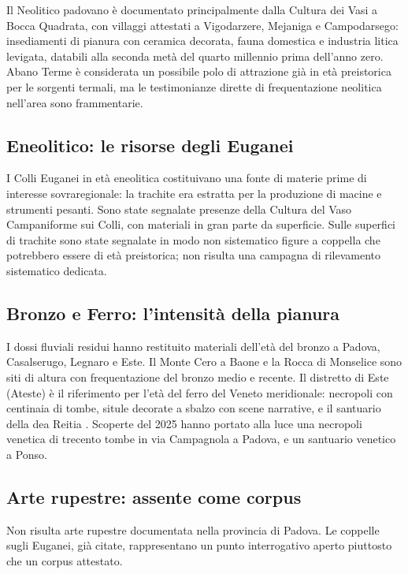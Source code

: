Il Neolitico padovano è documentato principalmente dalla Cultura dei Vasi a Bocca Quadrata, con villaggi attestati a Vigodarzere, Mejaniga e Campodarsego: insediamenti di pianura con ceramica decorata, fauna domestica e industria litica levigata, databili alla seconda metà del quarto millennio prima dell'anno zero. Abano Terme è considerata un possibile polo di attrazione già in età preistorica per le sorgenti termali, ma le testimonianze dirette di frequentazione neolitica nell'area sono frammentarie.

\subsection{Eneolitico: le risorse degli Euganei}

I Colli Euganei in età eneolitica costituivano una fonte di materie prime di interesse sovraregionale: la trachite era estratta per la produzione di macine e strumenti pesanti. Sono state segnalate presenze della Cultura del Vaso Campaniforme sui Colli, con materiali in gran parte da superficie. Sulle superfici di trachite sono state segnalate in modo non sistematico figure a coppella che potrebbero essere di età preistorica; non risulta una campagna di rilevamento sistematico dedicata.

\subsection{Bronzo e Ferro: l'intensità della pianura}

I dossi fluviali residui hanno restituito materiali dell'età del bronzo a Padova, Casalserugo, Legnaro e Este. Il Monte Cero a Baone e la Rocca di Monselice sono siti di altura con frequentazione del bronzo medio e recente. Il distretto di Este (Ateste) è il riferimento per l'età del ferro del Veneto meridionale: necropoli con centinaia di tombe, situle decorate a sbalzo con scene narrative, e il santuario della dea Reitia \citep{chieco_bianchi1988}. Scoperte del 2025 hanno portato alla luce una necropoli venetica di trecento tombe in via Campagnola a Padova, e un santuario venetico a Ponso.

\subsection{Arte rupestre: assente come corpus}

Non risulta arte rupestre documentata nella provincia di Padova. Le coppelle sugli Euganei, già citate, rappresentano un punto interrogativo aperto piuttosto che un corpus attestato.

